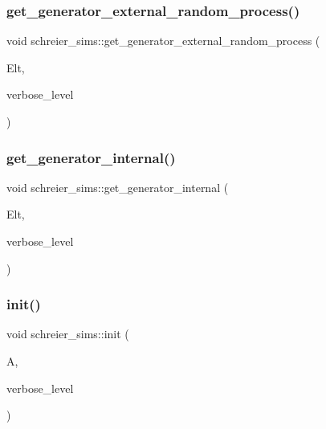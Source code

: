 \subsubsection{\texorpdfstring{get\+\_\+generator\+\_\+external\+\_\+random\+\_\+process()}{get\_generator\_external\_random\_process()}}
{\footnotesize\ttfamily void schreier\+\_\+sims\+::get\+\_\+generator\+\_\+external\+\_\+random\+\_\+process (\begin{DoxyParamCaption}\item[{\mbox{\hyperlink{galois_8h_a09fddde158a3a20bd2dcadb609de11dc}{I\+NT}} $\ast$}]{Elt,  }\item[{\mbox{\hyperlink{galois_8h_a09fddde158a3a20bd2dcadb609de11dc}{I\+NT}}}]{verbose\+\_\+level }\end{DoxyParamCaption})}

\mbox{\label{classschreier__sims_a8d2feedf9ac36e320ec0999b868a8f7b}} 
\subsubsection{\texorpdfstring{get\+\_\+generator\+\_\+internal()}{get\_generator\_internal()}}
{\footnotesize\ttfamily void schreier\+\_\+sims\+::get\+\_\+generator\+\_\+internal (\begin{DoxyParamCaption}\item[{\mbox{\hyperlink{galois_8h_a09fddde158a3a20bd2dcadb609de11dc}{I\+NT}} $\ast$}]{Elt,  }\item[{\mbox{\hyperlink{galois_8h_a09fddde158a3a20bd2dcadb609de11dc}{I\+NT}}}]{verbose\+\_\+level }\end{DoxyParamCaption})}

\mbox{\label{classschreier__sims_a360464a9d986401870264e415f132c67}} 
\subsubsection{\texorpdfstring{init()}{init()}}
{\footnotesize\ttfamily void schreier\+\_\+sims\+::init (\begin{DoxyParamCaption}\item[{\mbox{\hyperlink{classaction}{action}} $\ast$}]{A,  }\item[{\mbox{\hyperlink{galois_8h_a09fddde158a3a20bd2dcadb609de11dc}{I\+NT}}}]{verbose\+\_\+level }\end{DoxyParamCaption})}

